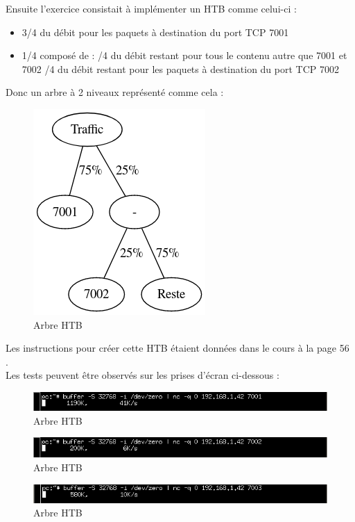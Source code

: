\documentclass{article}
\begin{document}
Ensuite l'exercice consistait à implémenter un HTB comme celui-ci : \\

\begin{itemize}
	\item 3/4 du débit pour les paquets à destination du port TCP 7001
	\item 1/4 composé de : 
	/4 du débit restant pour tous le contenu autre que 7001 et 7002
	/4 du débit restant pour les paquets à destination du port TCP 7002
\end{itemize}

Donc un arbre à 2 niveaux représenté comme cela :

\begin{figure}[h]
	\centering
	\includegraphics{./arbre-htb.png}
	\caption{Arbre HTB}
	\label{fig:htb-tree}
\end{figure}
\newpage

Les instructions pour créer cette HTB étaient données dans le cours à la page 56 \cite{doc-labo}. \\

Les tests peuvent être observés sur les prises d'écran ci-dessous : 

\begin{figure}[h]
	\centering
	\includegraphics{./captures/htb1.png}
	\caption{Arbre HTB}
	\label{fig:Débit port 7001}
\end{figure}
\begin{figure}[h]
	\centering
	\includegraphics{./captures/htb2.png}
	\caption{Arbre HTB}
	\label{fig:Débit port 7002}
\end{figure}
\begin{figure}[h]
	\centering
	\includegraphics{./captures/htb3.png}
	\caption{Arbre HTB}
	\label{fig:Débit port 7003}
\end{figure}
\newpage
\end{document}
